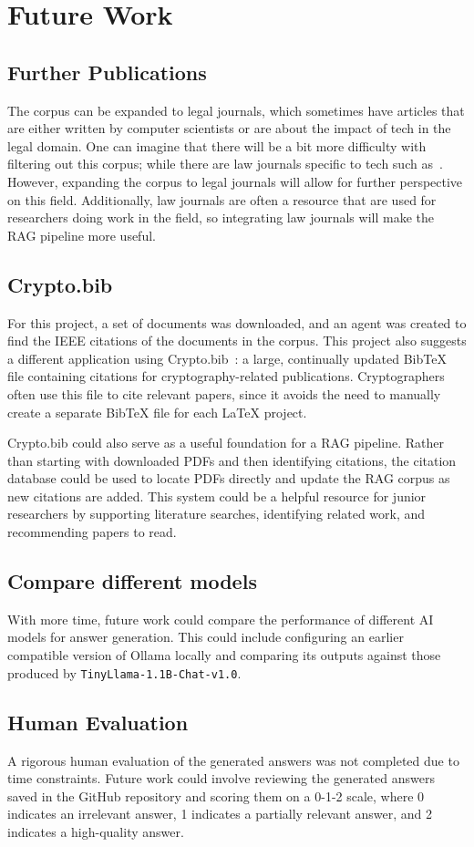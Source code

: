 \documentclass{article}
\begin{document}
\section{Future Work}
\subsection{Further Publications}
The corpus can be expanded to legal journals, which sometimes have articles that are either written by computer scientists or are about the impact of tech in the legal domain. 
One can imagine that there will be a bit more difficulty with filtering out this corpus; while there are law journals specific to tech such as~\cite{yale_jolt}. 
However, expanding the corpus to legal journals will allow for further perspective on this field. 
Additionally, law journals are often a resource that are used for researchers doing work in the field, so integrating law journals will make the RAG pipeline more useful. 

\subsection{Crypto.bib}
For this project, a set of documents was downloaded, and an agent was created to find the IEEE citations of the documents in the corpus. 
This project also suggests a different application using Crypto.bib~\cite{cryptobib}: a large, continually updated BibTeX file containing citations for cryptography-related publications. 
Cryptographers often use this file to cite relevant papers, since it avoids the need to manually create a separate BibTeX file for each LaTeX project.

Crypto.bib could also serve as a useful foundation for a RAG pipeline. 
Rather than starting with downloaded PDFs and then identifying citations, the citation database could be used to locate PDFs directly and update the RAG corpus as new citations are added. 
This system could be a helpful resource for junior researchers by supporting literature searches, identifying related work, and recommending papers to read.

\subsection{Compare different models}
With more time, future work could compare the performance of different AI models for answer generation. 
This could include configuring an earlier compatible version of Ollama locally and comparing its outputs against those produced by \texttt{TinyLlama-1.1B-Chat-v1.0}. 

\subsection{Human Evaluation}
A rigorous human evaluation of the generated answers was not completed due to time constraints. 
Future work could involve reviewing the generated answers saved in the GitHub repository and scoring them on a 0-1-2 scale, where 0 indicates an irrelevant answer, 1 indicates a partially relevant answer, and 2 indicates a high-quality answer.

\nocite{*}


\end{document}

